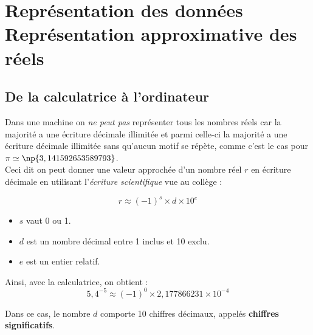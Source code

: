\documentclass[a4paper,12pt,french]{book}
\begin{document}
	\setcounter{chapter}{4}

	\chapter{\large Représentation des données \\[-1em]\fontsize{35pt}{42pt}\selectfont Représentation approximative des réels}


\section{De la calculatrice à l'ordinateur}
Dans une machine on \textit{ne peut pas} représenter tous les nombres réels car la majorité a une écriture décimale illimitée et parmi celle-ci la majorité a une écriture décimale illimitée sans qu'aucun motif se répète, comme c'est le cas pour $\pi\simeq\np{3,141 592 653 589 793}$.\\
Ceci dit on peut donner une valeur approchée d'un nombre réel $r$ en écriture décimale en
utilisant l'\textit{écriture scientifique} vue au collège :

	$$\boxed{r\approx (-1)^s\times d\times 10^{e}}$$

\begin{itemize}
\item 	$s$ vaut 0 ou 1.
\item 	$d$ est un nombre décimal entre 1 inclus et 10 exclu.
\item 	$e$ est un entier relatif.
\end{itemize}

Ainsi, avec la calculatrice, on obtient :
$$\boxed{5,4^{-5}\approx (-1)^0\times 2,177866231\times10^{-4}}$$

Dans ce cas, le nombre $d$ comporte 10 chiffres décimaux, appelés \textbf{chiffres significatifs}.
\end{document}
